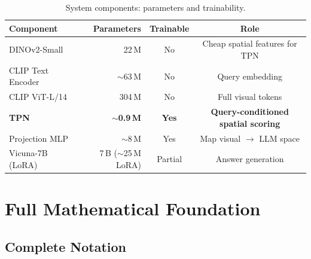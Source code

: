 \documentclass[11pt,a4paper]{article}
\begin{document}
\begin{table}[h]
\centering
\caption{System components: parameters and trainability.}
\label{tab:components}
\renewcommand{\arraystretch}{1.15}
\small
\begin{tabular}{@{}lrcc@{}}
  \toprule
  Component & Parameters & Trainable & Role \\
  \midrule
  DINOv2-Small & 22\,M & No & Cheap spatial features for TPN \\
  CLIP Text Encoder & $\sim$63\,M & No & Query embedding \\
  CLIP ViT-L/14 & 304\,M & No & Full visual tokens \\
  \textbf{TPN} & \textbf{$\sim$0.9\,M} & \textbf{Yes}
    & \textbf{Query-conditioned spatial scoring} \\
  Projection MLP & $\sim$8\,M & Yes & Map visual $\to$ LLM space \\
  Vicuna-7B (LoRA) & 7\,B ($\sim$25\,M LoRA) & Partial
    & Answer generation \\
  \bottomrule
\end{tabular}
\end{table}

\section{Full Mathematical Foundation}
\label{sec:math}

\subsection{Complete Notation}
\end{document}
